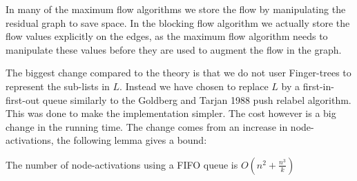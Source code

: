 In many of the maximum flow algorithms we store the flow by manipulating the residual graph to save space. In the blocking flow algorithm we actually store
the flow values explicitly on the edges, as the maximum flow algorithm needs to manipulate these values before they are used to augment the flow in the graph.

The biggest change compared to the theory is that we do not user Finger-trees to represent the sub-lists in $L$. Instead we have chosen to 
replace $L$ by a first-in-first-out queue similarly to the Goldberg and Tarjan 1988 push relabel algorithm. This was done to make the implementation simpler.
The cost however is a big change in the running time. The change comes from an increase in node-activations, the following lemma gives a bound:
\begin{lemma}
	The number of node-activations using a FIFO queue is $O(n^2 + \frac{n^3}{k})$
\end{lemma}
